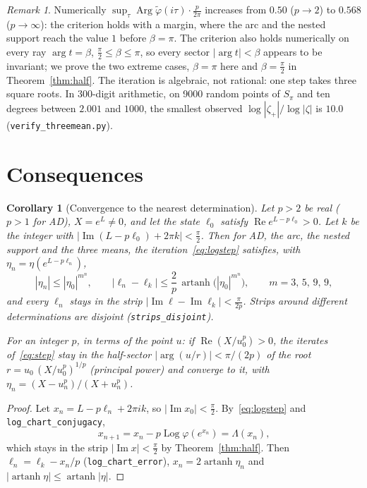 \documentclass[10pt,a4paper]{article}
\theoremstyle{plain}
\newtheorem{corollary}[theorem]{Corollary}
\theoremstyle{remark}
\newtheorem{remark}[theorem]{Remark}
\numberwithin{equation}{section}
\DeclareMathOperator{\re}{Re}\DeclareMathOperator{\im}{Im}
\DeclareMathOperator{\Arg}{Arg}\DeclareMathOperator{\Log}{Log}
\DeclareMathOperator{\artanh}{artanh}
\newcommand{\lean}[1]{\texttt{#1}}
\begin{document}
\begin{remark}\label{rem:slit}
Numerically $\sup_\tau\Arg\tilde\varphi(i\tau)\cdot\frac p{2\pi}$ increases from $0.50$ ($p\to2$) to
$0.568$ ($p\to\infty$): the criterion holds with a margin, where the arc and the nested support
reach the value $1$ before $\beta=\pi$. The criterion also holds numerically on every ray
$\arg t=\beta$, $\frac\pi2\le\beta\le\pi$, so every sector $|\arg t|<\beta$ appears to be invariant;
we prove the two extreme cases, $\beta=\pi$ here and $\beta=\frac\pi2$ in Theorem~\ref{thm:half}.
The iteration is algebraic, not rational: one step takes three square roots. In 300-digit
arithmetic, on 9000 random points of $S_\pi$ and ten degrees between $2.001$ and $1000$, the
smallest observed $\log|\zeta_+|/\log|\zeta|$ is $10.0$ (\texttt{verify\_threemean.py}).
\end{remark}

\section{Consequences}\label{sec:cor}

\begin{corollary}[Convergence to the nearest determination]\label{cor:conv}
Let $p>2$ be real ($p>1$ for AD), $X=e^{L}\neq0$, and let the state $\ell_0$ satisfy
$\re e^{L-p\ell_0}>0$. Let $k$ be the integer with $|\im(L-p\ell_0)+2\pi k|<\frac\pi2$. Then for AD,
the arc, the nested support and the three means, the iteration~\eqref{eq:logstep} satisfies, with
$\eta_n=\eta(e^{L-p\ell_n})$,
\[
 |\eta_n|\le|\eta_0|^{m^{n}},\qquad
 |\ell_n-\ell_k|\le\frac2p\,\artanh\bigl(|\eta_0|^{m^{n}}\bigr),\qquad m=3,\,5,\,9,\,9,
\]
and every $\ell_n$ stays in the strip $|\im\ell-\im\ell_k|<\frac{\pi}{2p}$. Strips around different
determinations are disjoint (\lean{strips\_disjoint}).

For an integer $p$, in terms of the point $u$: if $\re(X/u_0^{p})>0$, the iterates
of~\eqref{eq:step} stay in the half-sector $|\arg(u/r)|<\pi/(2p)$ of the root
$r=u_0\,(X/u_0^{p})^{1/p}$ (principal power) and converge to it, with
$\eta_n=(X-u_n^{p})/(X+u_n^{p})$.
\end{corollary}

\begin{proof}
Let $x_n=L-p\ell_n+2\pi i k$, so $|\im x_0|<\frac\pi2$. By~\eqref{eq:logstep} and
\lean{log\_chart\_conjugacy},
\[ x_{n+1}=x_n-p\Log\varphi(e^{x_n})=\Lambda(x_n), \]
which stays in the strip $|\im x|<\frac\pi2$ by Theorem~\ref{thm:half}. Then $\ell_n=\ell_k-x_n/p$
(\lean{log\_chart\_error}), $x_n=2\artanh\eta_n$ and $|\artanh\eta|\le\artanh|\eta|$.
\end{proof}
\end{document}

